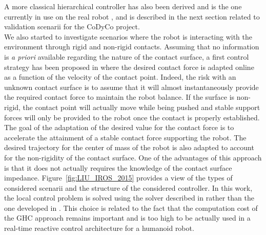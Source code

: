 \documentclass[final,5p,twocolumn]{elsarticle}
\begin{document}
A more classical hierarchical controller has also  been derived and is the one currently in use on the real robot \cite{DelPrete-2014-ID267}, \cite{noriFrontiers2015} and is described in the next section related to validation scenarii for the CoDyCo project.\\

We also started to investigate scenarios where the robot is interacting with the environment through rigid and non-rigid contacts. Assuming that no information is \textit{a priori} available regarding the nature of the contact surface, a first control strategy has been proposed in \cite{LiuIROS2015} where the desired contact force is adapted online as a function of the velocity of the contact point. Indeed, the risk with an unknown contact surface is to assume that it will almost instantaneously provide the required contact force to maintain the robot balance. If the surface is non-rigid, the contact point will actually move while being pushed and stable support forces will only be provided to the robot once the contact is properly established. The goal of the adaptation of the desired value for the contact force is to accelerate the attainment of a stable contact force supporting the robot. The desired trajectory for the center of mass of the robot is also adapted to account for the non-rigidity of the contact surface. One of the advantages of this approach is that it does not actually requires the knowledge of the contact surface impedance. Figure~\ref{fig:LIU_IROS_2015} provides a view of the types of considered scenarii and the structure of the considered controller. In this work, the local control problem is solved using the solver described in \cite{salini2012} rather than the one developed in \cite{liuGHC2015}. This choice is related to the fact that the computation cost of the GHC approach remains important and is too high to be actually used in a real-time reactive control architecture for a humanoid robot.
\end{document}
